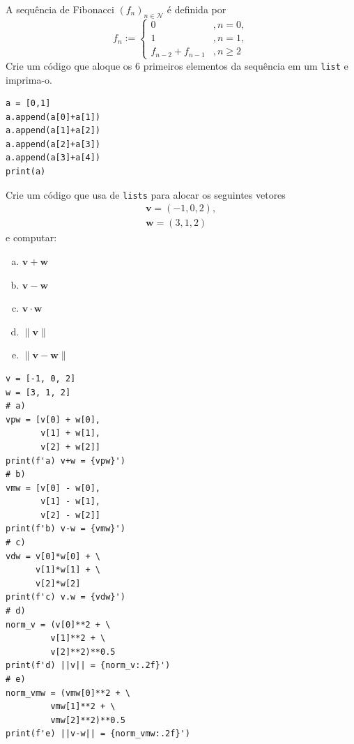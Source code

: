 \begin{exer}
  A sequência de Fibonacci{\fibonacci} $(f_n)_{n\in\mathcal{N}}$ é definida por
  \begin{equation}
    f_n := \left\{
    \begin{array}{ll}
      0 &, n=0,\\
      1 &, n=1,\\
      f_{n-2}+f_{n-1} &, n\geq 2
    \end{array}
  \right. 
\end{equation}
Crie um código que aloque os $6$ primeiros elementos da sequência em um \lstinline+list+ e imprima-o.
\end{exer}
\begin{resp}

\begin{lstlisting}
a = [0,1]
a.append(a[0]+a[1])
a.append(a[1]+a[2])
a.append(a[2]+a[3])
a.append(a[3]+a[4])
print(a)
\end{lstlisting}

\end{resp}

\begin{exer}
  Crie um código que usa de \lstinline+lists+ para alocar os seguintes vetores
  \begin{align}
    \pmb{v} = (-1, 0, 2),\\
    \pmb{w} = (3, 1, 2)
  \end{align}
  e computar:
  \begin{enumerate}[a)]
  \item $\pmb{v} + \pmb{w}$\\
  \item $\pmb{v} - \pmb{w}$\\
  \item $\pmb{v}\cdot \pmb{w}$\\
  \item $\|\pmb{v}\|$\\
  \item $\|\pmb{v} - \pmb{w}\|$
  \end{enumerate}
\end{exer}
\begin{resp}

\begin{lstlisting}
v = [-1, 0, 2]
w = [3, 1, 2]
# a)
vpw = [v[0] + w[0],
       v[1] + w[1],
       v[2] + w[2]]
print(f'a) v+w = {vpw}')
# b)
vmw = [v[0] - w[0],
       v[1] - w[1],
       v[2] - w[2]]
print(f'b) v-w = {vmw}')
# c)
vdw = v[0]*w[0] + \
      v[1]*w[1] + \
      v[2]*w[2]
print(f'c) v.w = {vdw}')
# d)
norm_v = (v[0]**2 + \
         v[1]**2 + \
         v[2]**2)**0.5
print(f'd) ||v|| = {norm_v:.2f}')
# e)
norm_vmw = (vmw[0]**2 + \
         vmw[1]**2 + \
         vmw[2]**2)**0.5
print(f'e) ||v-w|| = {norm_vmw:.2f}')
\end{lstlisting}

\end{resp}

